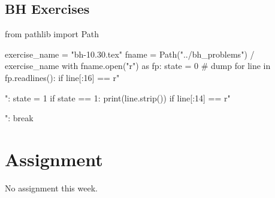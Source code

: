 \subsection{BH Exercises}
\label{sec:bh-exercises-1}


\begin{pycode}
from pathlib import Path

exercise_name = "bh-10.30.tex"
fname = Path("../bh_problems") / exercise_name
with fname.open("r") as fp:
    state = 0  # dump
    for line in fp.readlines():
        if line[:16] == r"\begin{exercise}":
            state = 1
        if state == 1:
            print(line.strip())
        if line[:14] == r"\end{exercise}":
            break
\end{pycode}







\section{Assignment}
\label{sec:assignment}

No assignment this week.


